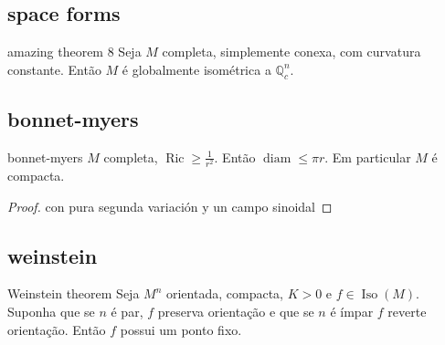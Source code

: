 \subsection{space forms}

\begin{thing6}{amazing theorem 8}\leavevmode
Seja \(M\) completa, simplemente conexa, com curvatura constante. Então \(M\) é globalmente isométrica a \(\mathbb{Q}^n_c\).
\end{thing6}

\subsection{bonnet-myers}

\begin{thing6}{bonnet-myers}\leavevmode
	\(M\) completa, \(\operatorname{Ric} \geq \frac{1}{r^2}\). Então \(\operatorname{diam}\leq \pi r\). Em particular \(M\) é compacta.
\end{thing6}
\begin{proof}\leavevmode
con pura segunda variación y un campo sinoidal
\end{proof}

\subsection{weinstein}
\begin{thing6}{Weinstein theorem}\label{thm:Weinstein theorem}\leavevmode
Seja \(M^n\) orientada, compacta, \(K>0\) e \(f \in \operatorname{Iso}(M)\).  Suponha que se \(n\) é par, \(f\) preserva orientação e que se \(n\) é ímpar \(f\) reverte orientação. Então \(f\) possui um ponto fixo.
\end{thing6}

